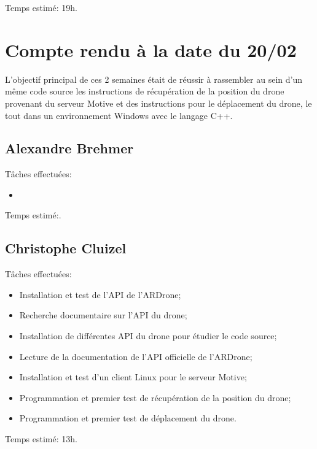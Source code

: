 Temps estimé: 19h.


\section{Compte rendu à la date du 20/02}
L'objectif principal de ces 2 semaines était de réussir à rassembler au sein d'un même code source les instructions de récupération de la position du drone provenant du serveur Motive et des instructions pour le déplacement du drone, le tout dans un environnement Windows avec le langage C++.

\subsection{Alexandre Brehmer}
Tâches effectuées:
\begin{itemize}
	\item {} \\
\end{itemize}

Temps estimé:.


\subsection{Christophe Cluizel}

Tâches effectuées:
\begin{itemize}
	\item Installation et test de l'API de l'ARDrone;
	\item Recherche documentaire sur l'API du drone;
	\item Installation de différentes API du drone pour étudier le code source;
	\item Lecture de la documentation de l'API officielle de l'ARDrone;
	\item Installation et test d'un client Linux pour le serveur Motive;
	\item Programmation et premier test de récupération de la position du drone;
	\item Programmation et premier test de déplacement du drone. \\
\end{itemize}

Temps estimé: 13h.
